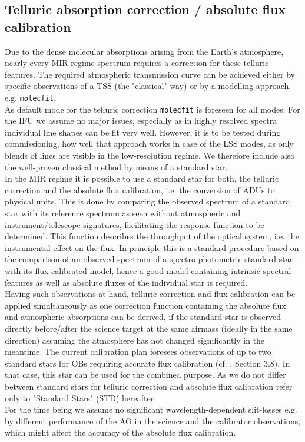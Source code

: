 
\subsection{Telluric absorption correction / absolute flux calibration}\label{ssec:tellcorr}
Due to the dense molecular absorptions arising from the Earth's atmosphere, nearly every \ac{MIR} regime spectrum requires a correction for these telluric features. The required atmospheric transmission curve can be achieved either by specific observations of a \ac{TSS} (the "classical" way) or by a modelling approach, e.g. \texttt{molecfit}.\\
As default mode for the telluric correction \texttt{molecfit} is foreseen for all modes. For the \ac{IFU} we assume no major issues, especially as in highly resolved spectra individual line shapes can be fit very well. However, it is to be tested during commissioning, how well that approach works in case of the \ac{LSS} modes, as only blends of lines are visible in the low-resolution regime. We therefore include also the well-proven classical method by means of a standard star.\\
In the \ac{MIR} regime it is possible to use a standard star for both, the telluric correction and the absolute flux calibration, i.e. the conversion of \ac{ADU}s to physical units. This is done by comparing the observed spectrum of a standard star with its reference spectrum as seen without atmospheric and instrument/telescope signatures, facilitating the response function to be determined. This function describes the throughput of the optical system, i.e. the instrumental effect on the flux. In principle this is a standard procedure based on the comparison of an observed spectrum of a spectro-photometric standard star with its flux calibrated model, hence a good model containing intrinsic spectral features as well as absolute fluxes of the individual star is required.\\
Having such observations at hand, telluric correction and flux calibration can be applied simultaneously as one correction function containing the absolute flux and atmospheric absorptions can be derived, if the standard star is observed directly before/after the science target at the same airmass (ideally in the same direction) assuming the atmosphere has not changed significantly in the meantime. The current calibration plan foresees observations of up to two standard stars for \ac{OB}s requiring accurate flux calibration (cf. \cite{METIS-calibration_plan}, Section 3.8). In that case, this star can be used for the combined purpose. As we do not differ between standard stars for telluric correction and absolute flux calibration refer only to "Standard Stars" (STD) hereafter.\\
For the time being we assume no significant wavelength-dependent slit-losses e.g. by different performance of the \ac{AO} in the science and the calibrator observations, which might affect the accuracy of the absolute flux calibration.  \\

